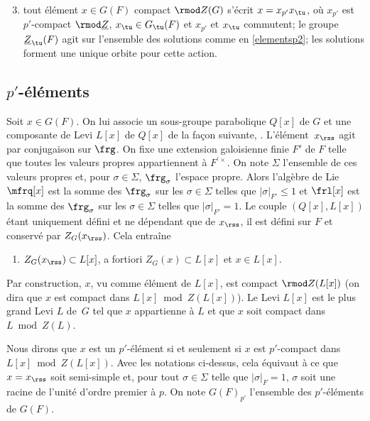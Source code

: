 \begin{enumerate}\setcounter{enumi}{2}
\item\label{elementsp3}
tout élément $x\in G(F)$ compact $\rmod Z(G)$ s'écrit $x=x_{p'}x_{\tu}$, où $x_{p'}$ est $p'$\nobreakdash-compact $\rmod \underline{Z}$, $x_{\tu}\in G_{\tu}(F)$ et $x_{p'}$ et $x_{\tu}$ commutent; le groupe $\underline{Z}_{\tu}(F)$ agit sur l'ensemble des solutions comme en \eqref{elementsp2}; les solutions forment une unique orbite pour cette action.
\end{enumerate}

\subsection{\texorpdfstring{$p'$}{p'}-éléments}\label{pelements}

Soit $x\in G(F)$. On lui associe un sous-groupe parabolique $Q[x]$ de $G$ et une composante de Levi $L[x]$ de $Q[x]$ de la façon suivante, \cf \cite{C}. L'élément~$x_{\rss}$ agit par conjugaison sur $\frg$. On fixe une extension galoisienne finie $F'$ de $F$ telle que toutes les valeurs propres appartiennent à $F^{\prime\times}$. On note $\Sigma$ l'ensemble de ces valeurs propres et, pour $\sigma\in \Sigma$, $\frg_{\sigma}$ l'espace propre. Alors l'algèbre de Lie $\mfrq[x]$ est la somme des $\frg_{\sigma}$ sur les $\sigma\in \Sigma$ telles que $\vert \sigma\vert _{F'}\leq 1$ et $\frl[x]$ est la somme des $\frg_{\sigma}$ sur les $\sigma\in \Sigma$ telles que $\vert \sigma\vert _{F'}= 1$.
Le couple $(Q[x], L[x])$ étant uniquement défini et ne dépendant que de $x_{\rss}$, il est défini sur $F$ et conservé par $Z_{G}(x_{\rss})$. Cela entraîne
\begin{enumerate}
\item\label{pelements1}
$Z_{G}(x_{\rss})\subset L[x]$, a fortiori $Z_{G}(x)\subset L[x]$ et $x\in L[x]$.
\end{enumerate}

Par construction, $x$, vu comme élément de $L[x]$, est compact $\rmod Z(L[x])$ (on dira que $x$ est compact dans $L[x]\bmod Z(L[x])$). Le Levi $L[x]$ est le plus grand Levi $L$ de~$G$ tel que $x$ appartienne à $L$ et que $x$ soit compact dans $L\bmod Z(L)$.

Nous dirons que $x$ est un $p'$-élément si et seulement si $x$ est $p'$-compact dans $L[x]\bmod Z(L[x])$. Avec les notations ci-dessus, cela équivaut à ce que $x=x_{\rss}$ soit semi-simple et, pour tout $\sigma\in \Sigma$ telle que $\vert \sigma\vert _{F}=1$, $\sigma$ soit une racine de l'unité d'ordre premier à $p$. On note $G(F)_{p'}$ l'ensemble des $p'$-éléments de $G(F)$.

